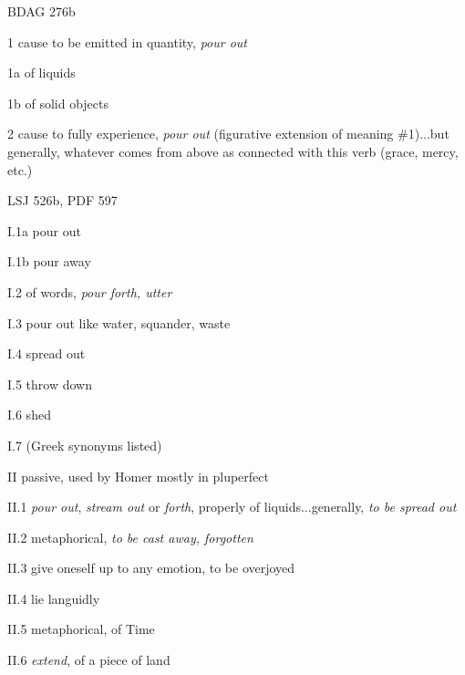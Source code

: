 				\begin{compactdesc}
					\item[BDAG 276b] \textbf{}
						\begin{compactitem}
							\item[1] cause to be emitted in quantity, \textit{pour out}
							\item[1a] of liquids
							\item[1b] of solid objects 
							\item[2] cause to fully experience, \textit{pour out} (figurative extension of meaning \#1)...but generally, whatever comes from above as connected with this verb (grace, mercy, etc.)
						\end{compactitem}
					\item[LSJ 526b, PDF 597] \textbf{}
						\begin{compactitem}
							\item[I.1a] pour out
							\item[I.1b] pour away
							\item[I.2] of words, \textit{pour forth, utter}
							\item[I.3] pour out like water, squander, waste
							\item[I.4] spread out
							\item[I.5] throw down
							\item[I.6] shed
							\item[I.7] (Greek synonyms listed)
							\item[II] passive, used by Homer mostly in pluperfect
							\item[II.1] \textit{pour out}, \textit{stream out} or \textit{forth}, properly of liquids...generally, \textit{to be spread out}
							\item[II.2] metaphorical, \textit{to be cast away, forgotten}
							\item[II.3] give oneself up to any emotion, to be overjoyed
							\item[II.4] lie languidly
							\item[II.5] metaphorical, of Time
							\item[II.6] \textit{extend}, of a piece of land
						\end{compactitem}
				\end{compactdesc}
				
